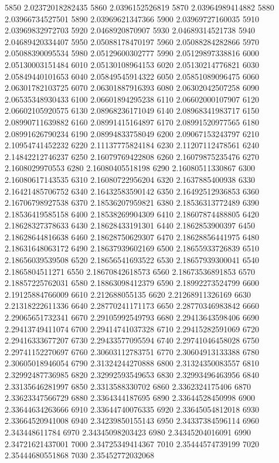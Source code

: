 {5850 2.02372018282435
5860 2.0396152526819
5870 2.03964989414882
5880 2.03966734527501
5890 2.03969621347366
5900 2.03969727160035
5910 2.03969832972703
5920 2.0468920870907
5930 2.04689314521738
5940 2.04689420334407
5950 2.05088178470197
5960 2.05088284282866
5970 2.05088390095534
5980 2.05129600302777
5990 2.05129897338816
6000 2.05130003151484
6010 2.05130108964153
6020 2.05130214776821
6030 2.05849440101653
6040 2.05849545914322
6050 2.05851089096475
6060 2.06301782103725
6070 2.06301887916393
6080 2.06302042507258
6090 2.06535348930433
6100 2.06601894295238
6110 2.06602000107907
6120 2.06602105920575
6130 2.08968236171049
6140 2.08968341983717
6150 2.08990711639882
6160 2.08991415164897
6170 2.08991520977565
6180 2.08991626790234
6190 2.08994833758049
6200 2.09067153243797
6210 2.10954741452232
6220 2.11137775824184
6230 2.11207112478561
6240 2.14842212746237
6250 2.16079769422808
6260 2.16079875235476
6270 2.1608029970553
6280 2.16080405518198
6290 2.16080511330867
6300 2.16080617143535
6310 2.16080722956204
6320 2.1637885400938
6330 2.16421485706752
6340 2.16432583590142
6350 2.16492512936853
6360 2.16706798927538
6370 2.18536207959821
6380 2.18536313772489
6390 2.18536419585158
6400 2.18538269904309
6410 2.18607874488805
6420 2.18628327378633
6430 2.18628433191301
6440 2.1862853900397
6450 2.18628644816638
6460 2.18628750629307
6470 2.18628856441975
6480 2.18631648063172
6490 2.18637939602169
6500 2.18655933726839
6510 2.18656039539508
6520 2.18656541693522
6530 2.18657939300041
6540 2.1865804511271
6550 2.18670842618573
6560 2.18673536891853
6570 2.18857225762031
6580 2.18863098412379
6590 2.18992273524799
6600 2.19125884766009
6610 2.212688055135
6620 2.21268911326169
6630 2.21318222611336
6640 2.28770241171173
6650 2.28770346983842
6660 2.29065651732341
6670 2.29105992549793
6680 2.29413643598406
6690 2.29413749411074
6700 2.29414741037328
6710 2.29415282591069
6720 2.29416333677207
6730 2.29433577095594
6740 2.29741046458028
6750 2.29741152270697
6760 2.30603112783751
6770 2.30604913133388
6780 2.30605018946054
6790 2.31324244270888
6800 2.31324350083557
6810 2.32992487736985
6820 2.32992593549653
6830 2.32993496463956
6840 2.33135646281997
6850 2.3313588330702
6860 2.3362324175406
6870 2.33623347566729
6880 2.3364344187695
6890 2.33644528450998
6900 2.33644634263666
6910 2.33644740076335
6920 2.33645054812018
6930 2.33664520941008
6940 2.34239850155143
6950 2.34337384596114
6960 2.343448611784
6970 2.34345098203423
6980 2.34345204016091
6990 2.34721621437001
7000 2.34725349414367
7010 2.35444574739199
7020 2.35444680551868
7030 2.35452772032068
}
